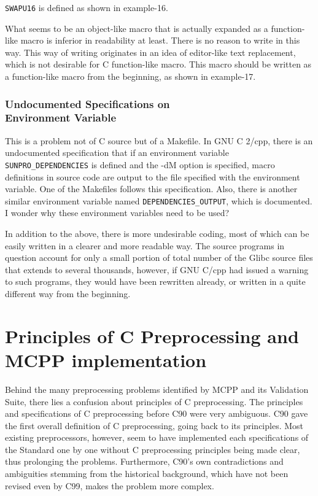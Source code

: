 \documentclass[twocolumn]{article}
\begin{document}
\verb|SWAPU16| is defined as shown in example-16.

What seems to be an object-like macro that is actually expanded as a function-like macro is inferior in readability at least.  There is no reason to write in this way.  This way of writing originates in an idea of editor-like text replacement, which is not desirable for C function-like macro.  This macro should be written as a function-like macro from the beginning, as shown in example-17.

\subsubsection{Undocumented Specifications on \\
Environment Variable}

This is a problem not of C source but of a Makefile.  In GNU C 2/cpp, there is an undocumented specification that if an environment variable \verb|SUNPRO_DEPENDENCIES| is defined and the -dM option is specified, macro definitions in source code are output to the file specified with the environment variable.  One of the Makefiles follows this specification.  Also, there is another similar environment variable named \verb|DEPENDENCIES_OUTPUT|, which is documented.  I wonder why these environment variables need to be used?

In addition to the above, there is more undesirable coding, most of which can be easily written in a clearer and more readable way.  The source programs in question account for only a small portion of total number of the Glibc source files that extends to several thousands, however, if GNU C/cpp had issued a warning to such programs, they would have been rewritten already, or written in a quite different way from the beginning.

\section{Principles of C Preprocessing and MCPP implementation}

Behind the many preprocessing problems identified by MCPP and its Validation Suite, there lies a confusion about principles of C preprocessing.  
The principles and specifications of C preprocessing before C90 were very ambiguous.  
C90 gave the first overall definition of C preprocessing, going back to its principles.  
Most existing preprocessors, however, seem to have implemented each specifications of the Standard one by one without C preprocessing principles being made clear, thus prolonging the problems.  
Furthermore, C90's own contradictions and ambiguities stemming from the historical background, which have not been revised even by C99, makes the problem more complex.
\end{document}
